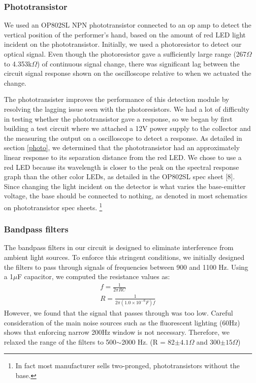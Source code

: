 \documentclass[twocolumn]{article}
\begin{document}
\subsubsection{Phototransistor}
\par We used an OP802SL NPN phototransistor connected to an op amp to detect the vertical position of the performer's hand, based on the amount of red LED light incident on the phototransistor. Initially, we used a photoresistor to detect our optical signal. Even though the photoresistor gave a sufficiently large range (267$\Omega$ to 4.353k$\Omega$) of continuous signal change, there was significant lag between the circuit signal response shown on the oscilloscope relative to when we actuated the change. 
\par The phototransister improves the performance of this detection module by resolving the lagging issue seen with the photoresistors. We had a lot of difficulty in testing whether the phototransistor gave a response, so we began by first building a test circuit where we attached a 12V power supply to the collector and the measuring the output on a oscilloscope to detect a response. As detailed in section \ref{photo}, we determined that the phototransistor had an approximately linear response to its separation distance from the red LED. We chose to use a red LED because its wavelength is closer to the peak on the spectral response graph than the other color LEDs, as detailed in the OP802SL spec sheet {\footnotesize[8]}. Since changing the light incident on the detector is what varies the base-emitter voltage, the base should be connected to nothing, as denoted in most schematics on phototransistor spec sheets. \footnote{In fact most manufacturer sells two-pronged, phototransistors without the base.}  
\subsubsection{Bandpass filters}
The bandpass filters in our circuit is designed to eliminate interference from ambient light sources. To enforce this stringent conditions, we initially designed the filters to pass through signals of frequencies between 900 and 1100 Hz. Using a 1$\mu$F capacitor, we computed the resistance values as: 
\begin{align*}
f = \frac{1}{2\pi RC}
\\ R = \frac{1}{2\pi (1.0\times10^{-6} F)f}
\end{align*}
However, we found that the signal that passes through was too low. Careful consideration of the main noise sources such as the fluorescent lighting (60Hz) shows that enforcing narrow 200Hz window is not necessary. Therefore, we relaxed the range of the filters to 500$\sim$2000 Hz. (R = 82$\pm 4.1\Omega$ and 300$\pm15\Omega$)
\end{document}
